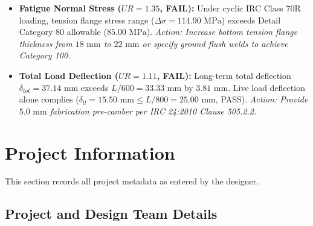 \documentclass[12pt,a4paper]{report}
\numberwithin{table}{chapter}
\numberwithin{figure}{chapter}
\begin{document}
\vspace{-0.3cm}
\begin{engWarningBox}
\small
\begin{itemize}[leftmargin=1.5em,itemsep=1pt,topsep=1pt]
\item \textbf{Fatigue Normal Stress ($UR = 1.35$, FAIL):} Under cyclic IRC Class 70R loading, tension flange stress range ($\Delta\sigma = 114.90\text{ MPa}$) exceeds Detail Category 80 allowable ($85.00\text{ MPa}$). \textit{Action: Increase bottom tension flange thickness from $18\text{ mm}$ to $22\text{ mm}$ or specify ground flush welds to achieve Category 100.}
\item \textbf{Total Load Deflection ($UR = 1.11$, FAIL):} Long-term total deflection $\delta_{tot} = 37.14\text{ mm}$ exceeds $L/600 = 33.33\text{ mm}$ by $3.81\text{ mm}$. Live load deflection alone complies ($\delta_{ll} = 15.50\text{ mm} \le L/800 = 25.00\text{ mm}$, PASS). \textit{Action: Provide $5.0\text{ mm}$ fabrication pre-camber per IRC 24:2010 Clause 505.2.2.}
\end{itemize}
\end{engWarningBox}

\titleformat{\chapter}[block]{\normalfont\Large\bfseries\centering}{\thechapter}{1em}{}
\titlespacing*{\chapter}{0pt}{-30pt}{10pt}


\clearpage
{}
\setcounter{page}{1}
\pagestyle{main}


\chapter{Project Information}

This section records all project metadata as entered by the designer.

\section{Project and Design Team Details}
\label{sec:project-details}
\end{document}
